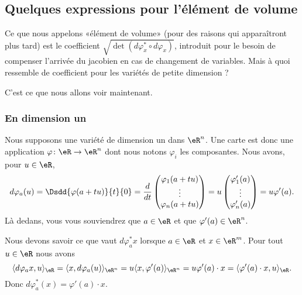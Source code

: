 \subsection{Quelques expressions pour l'élément de volume}

Ce que nous appelons «élément de volume» (pour des raisons qui apparaîtront plus tard) est le coefficient \( \sqrt{ \det(d\varphi_x^*\circ d\varphi_x) }\), introduit pour le besoin de compenser l'arrivée du jacobien en cas de changement de variables. Mais à quoi ressemble de coefficient pour les variétés de petite dimension ?

C'est ce que nous allons voir maintenant.

\subsubsection{En dimension un}

Nous supposons une variété de dimension un dans \( \eR^n\). Une carte est donc une application \( \varphi\colon \eR\to \eR^n\) dont nous notons \( \varphi_i\) les composantes. Nous avons, pour \( u\in \eR\),
\begin{equation}
    d\varphi_a(u)=\Dsdd{ \varphi(a+tu) }{t}{0}=\frac{ d }{ dt }\begin{pmatrix}
        \varphi_1(a+tu)    \\ 
        \vdots    \\ 
        \varphi_n(a+tu)    
    \end{pmatrix}=u\begin{pmatrix}
        \varphi'_1(a)    \\ 
        \vdots    \\ 
        \varphi_n'(a)    
    \end{pmatrix}=u\varphi'(a).
\end{equation}
Là dedans, vous vous souviendrez que \( a\in \eR\) et que \( \varphi'(a)\in \eR^n\).

Nous devons savoir ce que vaut \( d\varphi_a^*x\) lorsque \( a\in \eR\) et \( x\in \eR^m\). Pour tout \( u\in \eR\) nous avons
\begin{equation}
    \langle d\varphi_ax, u\rangle_{\eR}=\langle x, d\varphi_a(u)\rangle_{\eR^n}=u\langle x, \varphi'(a)\rangle_{\eR^n}=u\varphi'(a)\cdot x=\langle \varphi'(a)\cdot x, u\rangle_{\eR}.
\end{equation}
Donc \( d\varphi_a^*(x)=\varphi'(a)\cdot x\).

